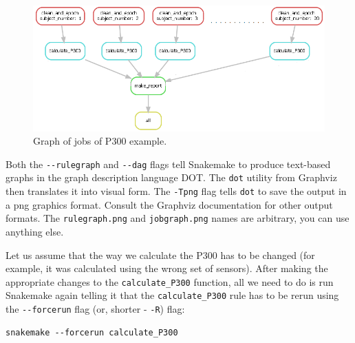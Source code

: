 \documentclass[a4paper,man,floatsintext,natbib]{apa6}
\begin{document}
\begin{figure}
\centering
\captionsetup{justification=centering}
\includegraphics[height=\textheight,width=\textwidth,keepaspectratio]{pictures/Snakemake_dag_graph_cut.png}
\caption{Graph of jobs of P300 example.} \label{fig3}
\end{figure}

Both the \verb|--rulegraph| and \verb|--dag| flags tell Snakemake to produce text-based graphs in the graph description language DOT. The \verb|dot| utility from Graphviz then translates it into visual form. The \verb|-Tpng| flag tells \verb|dot| to save the output in a png graphics format. Consult the Graphviz documentation for other output formats. The \verb|rulegraph.png| and \verb|jobgraph.png| names are arbitrary, you can use anything else.

Let us assume that the way we calculate the P300 has to be changed (for example, it was calculated using the wrong set of sensors). After making the appropriate changes to the \verb|calculate_P300| function, all we need to do is run Snakemake again telling it that the \verb|calculate_P300| rule has to be rerun using the \verb|--forcerun| flag (or, shorter - \verb|-R|) flag:

\begin{verbatim}
snakemake --forcerun calculate_P300
\end{verbatim}
\end{document}
